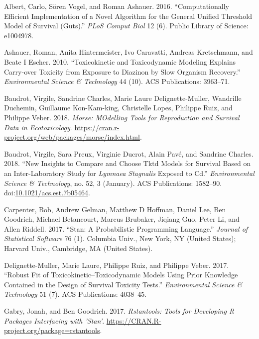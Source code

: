\documentclass[fleqn,10pt,lineno]{wlpeerj} %
\begin{document}
\hypertarget{ref-Albert2016}{}
Albert, Carlo, Sören Vogel, and Roman Ashauer. 2016. ``Computationally
Efficient Implementation of a Novel Algorithm for the General Unified
Threshold Model of Survival (Guts).'' \emph{PLoS Comput Biol} 12 (6).
Public Library of Science: e1004978.

\hypertarget{ref-Ashauer2010}{}
Ashauer, Roman, Anita Hintermeister, Ivo Caravatti, Andreas Kretschmann,
and Beate I Escher. 2010. ``Toxicokinetic and Toxicodynamic Modeling
Explains Carry-over Toxicity from Exposure to Diazinon by Slow Organism
Recovery.'' \emph{Environmental Science \& Technology} 44 (10). ACS
Publications: 3963--71.

\hypertarget{ref-Baudrot2018morse}{}
Baudrot, Virgile, Sandrine Charles, Marie Laure Delignette-Muller,
Wandrille Duchemin, Guillaume Kon-Kam-king, Christelle Lopes, Philippe
Ruiz, and Philippe Veber. 2018. \emph{Morse: MOdelling Tools for
Reproduction and Survival Data in Ecotoxicology}.
\url{https://cran.r-project.org/web/packages/morse/index.html}.

\hypertarget{ref-Baudrot2018EST}{}
Baudrot, Virgile, Sara Preux, Virginie Ducrot, Alain Pavé, and Sandrine
Charles. 2018. ``New Insights to Compare and Choose Tktd Models for
Survival Based on an Inter-Laboratory Study for \emph{Lymnaea Stagnalis}
Exposed to Cd.'' \emph{Environmental Science \& Technology}, no. 52, 3
(January). ACS Publications: 1582--90.
doi:\href{https://doi.org/10.1021/acs.est.7b05464}{10.1021/acs.est.7b05464}.

\hypertarget{ref-Carpenter2017stan}{}
Carpenter, Bob, Andrew Gelman, Matthew D Hoffman, Daniel Lee, Ben
Goodrich, Michael Betancourt, Marcus Brubaker, Jiqiang Guo, Peter Li,
and Allen Riddell. 2017. ``Stan: A Probabilistic Programming Language.''
\emph{Journal of Statistical Software} 76 (1). Columbia Univ., New York,
NY (United States); Harvard Univ., Cambridge, MA (United States).

\hypertarget{ref-Delignette-Muller2017}{}
Delignette-Muller, Marie Laure, Philippe Ruiz, and Philippe Veber. 2017.
``Robust Fit of Toxicokinetic--Toxicodynamic Models Using Prior
Knowledge Contained in the Design of Survival Toxicity Tests.''
\emph{Environmental Science \& Technology} 51 (7). ACS Publications:
4038--45.

\hypertarget{ref-Gabry2017rstantools}{}
Gabry, Jonah, and Ben Goodrich. 2017. \emph{Rstantools: Tools for
Developing R Packages Interfacing with 'Stan'}.
\url{https://CRAN.R-project.org/package=rstantools}.
\end{document}

